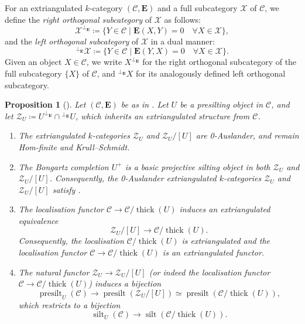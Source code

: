 \documentclass[10pt,twoside, a4paper,reqno]{amsart}
\DeclareMathOperator{\silt}{silt}
\DeclareMathOperator{\presilt}{presilt}
\DeclareMathOperator{\thick}{thick}
\newcommand{\sth}{\;\vert\;}
\newcommand{\calC}{\mathcal{C}}
\newcommand{\calZ}{\mathcal{Z}}
\newcommand{\E}{\mathbf{E}}
\newtheorem{proposition}[theorem]{Proposition}
\theoremstyle{definition}
\begin{document}
For an extriangulated $k$-category $(\calC,\E)$ and a full subcategory $\mathcal{X}$ of $\calC$, we define the \textit{right orthogonal subcategory} of $\mathcal{X}$ as follows:
\begin{equation*}
	\mathcal{X}^{\perp_{\E}} \coloneqq \{Y\in \calC \sth \E(X,Y)=0 \quad \forall X\in \mathcal{X} \},
\end{equation*}
and the \textit{left orthogonal subcategory} of $\mathcal{X}$ in a dual manner:
\begin{equation*}
	{^{\perp_{\E}}\mathcal{X}} \coloneqq \{Y\in \calC \sth \E(Y,X)=0 \quad \forall X\in \mathcal{X} \}.
\end{equation*}
Given an object $X\in \calC$, we write ${X}^{\perp_{\E}}$ for the right orthogonal subcategory of the full subcategory {$\{ X\}$} of $\calC$, and ${^{\perp_{\E}}{X}}$ for its {analogously defined} left orthogonal subcategory.

\begin{proposition}[{\cite[§5]{Bor24}}]\label{prop:siltred}
    Let $(\calC,\E)$ be as in .
    Let $U$ be a presilting object in $\calC$, and let $\calZ_U \coloneqq U^{\perp_{\E}}\cap {^{\perp_{\E}}U}${, which inherits an extriangulated structure from $\calC$}.
    \begin{enumerate}
        \item\label{prop:siltred_0Aus} The extriangulated $k$-categories $\calZ_U$ and $\calZ_U/[U]$ are 0-Auslander, and remain Hom-finite and Krull--Schmidt. 
        \item\label{prop:siltred_0Aus_proj} The Bongartz completion $U^+$ is a basic projective silting object in both $\calZ_U$ and $\calZ_U/[U]$. Consequently, the 0-Auslander extriangulated $k$-categories $\calZ_U$ and $\calZ_U/[U]$ satisfy .
        \item\label{prop:siltred_equiv} The localisation functor $\calC \to \calC/\thick(U)$ induces an extriangulated equivalence 
    \begin{equation}
       \calZ_U/[U] \to \calC/\thick(U).
    \end{equation}
    Consequently, the localisation $\calC/\thick(U)$ is extriangulated and the localisation functor $\calC \to \calC/\thick(U)$ is an extriangulated functor.
    \item\label{prop:siltred_bij} The natural functor $\calZ_U \to \calZ_U/[U]$
    (or indeed the localisation functor $\calC \to \calC/\thick(U)$) induces a bijection
    \begin{equation*}
        \presilt_U(\calC) \to \presilt(\calZ_U/[U]) \simeq \presilt(\calC/\thick(U)),
    \end{equation*}
    which restricts to a bijection
    \begin{equation*}
        \silt_U(\calC) \to \silt(\calC/\thick(U)).
    \end{equation*}
    \end{enumerate}
\end{proposition}
\end{document}
